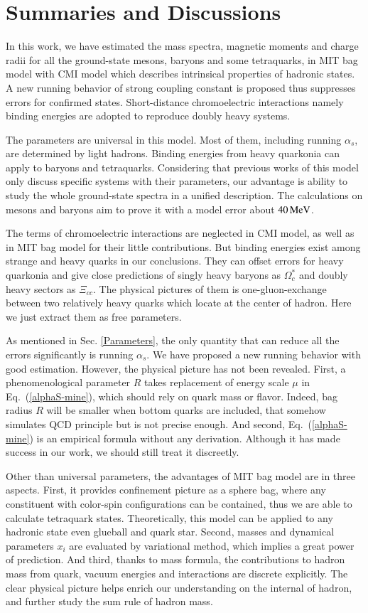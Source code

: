 \documentclass[prd,twocolumn,floatfix,nofootinbib]{revtex4}
\begin{document}
\section{Summaries and Discussions}\label{Discussions}
In this work, we have estimated the mass spectra, magnetic moments and charge radii for all the ground-state mesons, baryons and some tetraquarks, 
in MIT bag model with CMI model which describes intrinsical properties of hadronic states.
A new running behavior of strong coupling constant is proposed thus suppresses errors for confirmed states.
Short-distance chromoelectric interactions namely binding energies are adopted to reproduce doubly heavy systems.

The parameters are universal in this model. Most of them, including running $\alpha_{s}$, are determined by light hadrons.
Binding energies from heavy quarkonia can apply to baryons and tetraquarks.
Considering that previous works of this model only discuss specific systems with their parameters, our advantage is ability to study the whole ground-state spectra in a unified description.
The calculations on mesons and baryons aim to prove it with a model error about $40\,{\rm MeV}$.

The terms of chromoelectric interactions are neglected in CMI model, as well as in MIT bag model for their little contributions.
But binding energies exist among strange and heavy quarks in our conclusions.
They can offset errors for heavy quarkonia and give close predictions of singly heavy baryons as $\Omega_{c}^{\ast}$ and doubly heavy sectors as $\Xi_{cc}$.
The physical pictures of them is one-gluon-exchange between two relatively heavy quarks which locate at the center of hadron.
Here we just extract them as free parameters.

As mentioned in Sec. \ref{Parameters}, the only quantity that can reduce all the errors significantly is running $\alpha_{s}$. 
We have proposed a new running behavior with good estimation. However, the physical picture has not been revealed.
First, a phenomenological parameter $R$ takes replacement of energy scale $\mu$ in Eq.~(\ref{alphaS-mine}), which should rely on quark mass or flavor.
Indeed, bag radius $R$ will be smaller when bottom quarks are included, that somehow simulates QCD principle but is not precise enough.
And second, Eq.~(\ref{alphaS-mine}) is an empirical formula without any derivation.
Although it has made success in our work, we should still treat it discreetly.

Other than universal parameters, the advantages of MIT bag model are in three aspects.
First, it provides confinement picture as a sphere bag, where any constituent with color-spin configurations can be contained, thus we are able to calculate tetraquark states.
Theoretically, this model can be applied to any hadronic state even glueball and quark star. 
Second, masses and dynamical parameters $x_{i}$ are evaluated by variational method, which implies a great power of prediction.
And third, thanks to mass formula, the contributions to hadron mass from quark, vacuum energies and interactions are discrete explicitly.
The clear physical picture helps enrich our understanding on the internal of hadron, and further study the sum rule of hadron mass.
\end{document}
